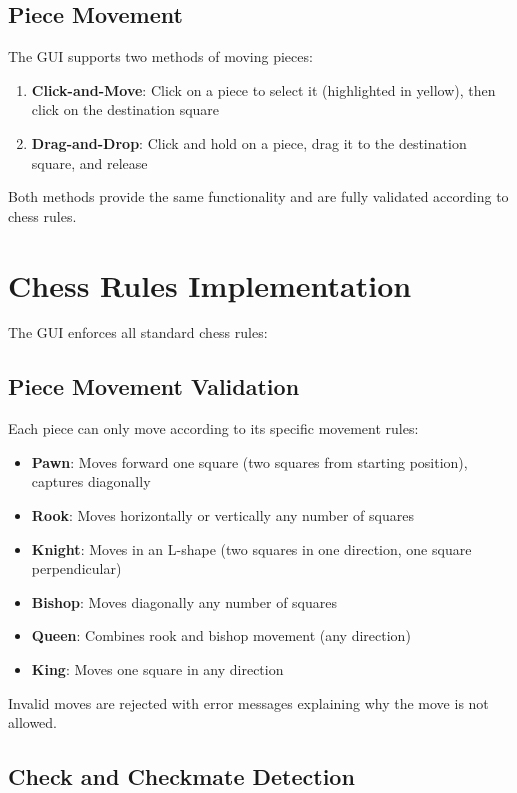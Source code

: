 \documentclass[12pt]{article}
\begin{document}
\subsection{Piece Movement}

The GUI supports two methods of moving pieces:

\begin{enumerate}
    \item \textbf{Click-and-Move}: Click on a piece to select it (highlighted in yellow), then click on the destination square
    \item \textbf{Drag-and-Drop}: Click and hold on a piece, drag it to the destination square, and release
\end{enumerate}

Both methods provide the same functionality and are fully validated according to chess rules.

\section{Chess Rules Implementation}

The GUI enforces all standard chess rules:

\subsection{Piece Movement Validation}

Each piece can only move according to its specific movement rules:
\begin{itemize}
    \item \textbf{Pawn}: Moves forward one square (two squares from starting position), captures diagonally
    \item \textbf{Rook}: Moves horizontally or vertically any number of squares
    \item \textbf{Knight}: Moves in an L-shape (two squares in one direction, one square perpendicular)
    \item \textbf{Bishop}: Moves diagonally any number of squares
    \item \textbf{Queen}: Combines rook and bishop movement (any direction)
    \item \textbf{King}: Moves one square in any direction
\end{itemize}

Invalid moves are rejected with error messages explaining why the move is not allowed.

\subsection{Check and Checkmate Detection}
\end{document}
